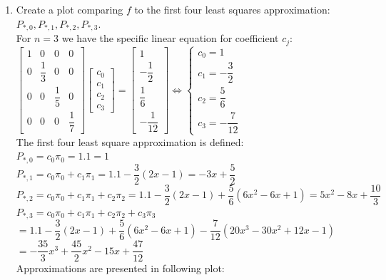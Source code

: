\documentclass[14pt,a4paper]{article}
\begin{document}
\begin{enumerate}
	\label{3d}
	\item Create a plot comparing $f$ to the first four least squares approximation: $P_{*,0}, P_{*,1}, P_{*,2}, P_{*,3}$.\\
	For $n=3$ we have the specific linear equation for coefficient $c_j$:\\
	\hspace*{2cm} $\begin{bmatrix} 1&0&0&0 \\ 0&\dfrac{1}{3}&0&0 \\0&0&\dfrac{1}{5}&0 \\0&0&0&\dfrac{1}{7} \end{bmatrix} \begin{bmatrix} c_0\\c_1\\c_2\\c_3 \end{bmatrix} = \begin{bmatrix} 1\\-\dfrac{1}{2} \\ \dfrac{1}{6} \\ -\dfrac{1}{12} \end{bmatrix} \Leftrightarrow \begin{cases} c_0 = 1 \\ c_1 = -\dfrac{3}{2} \\ c_2 = \dfrac{5}{6} \\ c_3 = -\dfrac{7}{12} \end{cases} $ \\
	The first four least square approximation is defined:\\
	$P_{*,0} = c_0\pi_0 = 1.1 = 1$\\
	$P_{*,1} = c_0\pi_0 + c_1\pi_1 = 1.1 - \dfrac{3}{2}(2x-1) = -3x + \dfrac{5}{2}$\\
	$P_{*,2} = c_0\pi_0 + c_1\pi_1 + c_2\pi_2 = 1.1 - \dfrac{3}{2}(2x-1) + \dfrac{5}{6}(6x^2-6x+1) = 5x^2 -8x + \dfrac{10}{3}$\\
	$P_{*,3} = c_0\pi_0 + c_1\pi_1 + c_2\pi_2 + c_3\pi_3$\\
	\hspace*{0.7cm} $ = 1.1 - \dfrac{3}{2}(2x-1) + \dfrac{5}{6}(6x^2-6x+1) - \dfrac{7}{12}(20x^3 -30x^2 + 12x -1)$ \\
	\hspace*{0.7cm} $ = - \dfrac{35}{3}x^3 + \dfrac{45}{2}x^2 -15x + \dfrac{47}{12}$\\
	Approximations are presented in following plot:\\
	\begin{figure}[htp]

\end{figure}
\end{enumerate}
\end{document}
